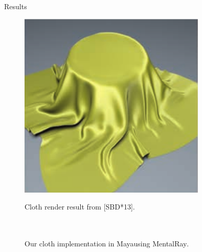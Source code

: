 \documentclass{beamer}
\begin{document}
\begin{frame}{Results}

\begin{figure}[!htb]
    \centering
    \begin{minipage}{.48\textwidth}
        \centering
        \includegraphics[width=0.8\textwidth]{img/cloth_paper}
        \caption*{Cloth render result from [SBD*13].}
    \end{minipage}%
	\centering
	~
    \begin{minipage}{.48\textwidth}
        \centering
        \caption*{Our cloth implementation in Maya\textsuperscript\textregistered using MentalRay\textsuperscript\textregistered.}
    \end{minipage}%
\end{figure}
\end{frame}
\end{document}
